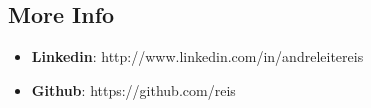 \documentclass[margin]{res}
\begin{document}
\begin{resume}
\section{More Info}
  \begin{itemize}
    \item \textbf{Linkedin}: http://www.linkedin.com/in/andreleitereis
    \item \textbf{Github}: https://github.com/reis
  \end{itemize}


\end{resume} 
\end{document}
